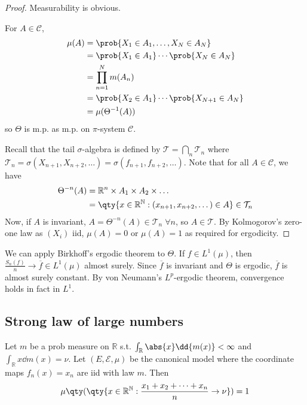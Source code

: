 \begin{proof}
	Measurability is obvious.

	For $A \in \mathcal C$,
	\begin{align*}
			\mu(A) &= \prob{X_1 \in A_1, \dots, X_N \in A_N} \\
			&= \prob{X_1 \in A_1} \cdots \prob{X_N \in A_N} \\
			&= \prod_{n=1}^N m(A_n) \\
			&= \prob{X_2 \in A_1} \cdots \prob{X_{N+1} \in A_N} \\
			&= \mu(\Theta^{-1}(A))
	\end{align*}
	so $\Theta$ is m.p. as m.p. on $\pi$-system $\mathcal{C}$.

	Recall that the tail $\sigma$-algebra is defined by $\mathcal T = \bigcap_n \mathcal T_n$ where $\mathcal T_n = \sigma(X_{n+1}, X_{n+2}, \dots) = \sigma(f_{n+1}, f_{n+2}, \dots)$.
	Note that for all $A \in \mathcal C$, we have
	\begin{align*}
        \Theta^{-n}(A) &= \mathbb{R}^n \times A_1 \times A_2 \times \dots \\
		&= \qty{x \in \mathbb R^{\mathbb N} : (x_{n+1}, x_{n+2}, \dots) \in A} \in \mathcal T_n
    \end{align*}
	Now, if $A$ is invariant, $A = \Theta^{-n}(A) \in \mathcal T_n \; \forall n$, so $A \in \mathcal T$.
	By Kolmogorov's zero-one law as $(X_i)$ iid, $\mu(A) = 0$ or $\mu(A) = 1$ as required for ergodicity.
\end{proof}
We can apply Birkhoff's ergodic theorem to $\Theta$.
If $f \in L^1(\mu)$, then $\frac{S_n(f)}{n} \to \overline f \in L^1(\mu)$ almost surely.
Since $\overline f$ is invariant and $\Theta$ is ergodic, $\overline f$ is almost surely constant.
By von Neumann's $L^p$-ergodic theorem, convergence holds in fact in $L^1$.

\subsection{Strong law of large numbers}

\begin{theorem} \label{thm:canonical}
	Let $m$ be a prob measure on $\mathbb{R}$ s.t. $\int_{\mathbb R} \abs{x} \dd{m(x)} < \infty$ and $\int_{\mathbb R} x \dd{m(x)} = \nu$.
	Let $(E, \mathcal{E}, \mu)$ be the canonical model where the coordinate maps $f_n(x) = x_n$ are iid with law $m$.
	Then
	\begin{align*}
        \mu\qty(\qty{x \in \mathbb R^{\mathbb N} : \frac{x_1 + x_2 + \dots + x_n}{n} \to \nu}) = 1
    \end{align*}
\end{theorem}

